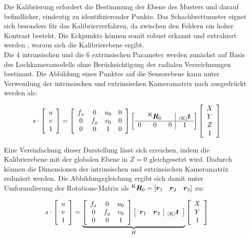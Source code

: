 Die Kalibrierung erfordert die Bestimmung der Ebene des Musters und darauf befindlicher, eindeutig zu identifizierender Punkte. Das Schachbrettmuster eignet sich besonders für das Kalibrierverfahren, da zwischen den Feldern ein hoher Kontrast besteht. Die Eckpunkte können somit robust erkannt und extrahiert werden \red[Verfahren?], woraus sich die Kalibrierebene ergibt. \\

Die 4 intrinsischen und die 6 extrinsischen Parameter werden zunächst auf Basis des Lochkameramodells ohne Berücksichtigung der radialen Verzeichnungen bestimmt. Die Abbildung eines Punktes auf die Sensorebene kann unter Verwendung der intrinsischen und extrinsischen Kameramatrix nach  ausgedrückt werden als:

\begin{equation}
s \cdot 
\mat{c}{
u\\
v\\
1
}
=
\mat{cccc}{
f_x & 0 & u_0 & 0\\
0 & f_y & v_0 & 0\\
0 & 0 & 1 & 0
}
\mat{ccc|c}{
  & \rmat{K}{0} &   & \ve{K}{t} \\
\hline
0 &      0      & 0 & 1 \\
}
\mat{c}{
X\\
Y\\
Z\\
1
}
\end{equation}

Eine Vereinfachung dieser Darstellung lässt sich erreichen, indem die Kalibrierebene mit der globalen Ebene in $Z=0$ gleichgesetzt wird. Dadurch können die Dimensionen der intrinsischen und extrinsischen Kameramatrix reduziert werden. Die Abbildungsgleichung ergibt sich damit unter Umformulierung der Rotations-Matrix als $\rmat{K}{0} = [\vec{r}_1 \quad \vec{r}_2 \quad \vec{r}_3]$ zu:

\begin{equation}
s \cdot
\mat{c}{
u\\
v\\
1
}
 = 
\underbrace{
\mat{ccc}{ 
	f_x & 0 & u_0\\
	0 & f_y & v_0\\
	0 & 0 & 1
}
\mat{cc|c}{ 
	\vec{r}_1 & \vec{r}_2 & \ve{K}{t} \\
}
}_H
\mat{c}{
	X\\
	Y\\
	1
}
\end{equation}

